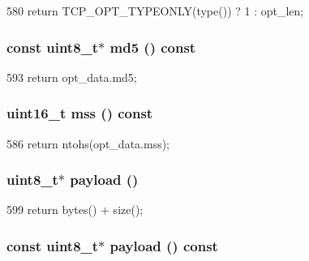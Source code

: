 \begin{DoxyCode}
580 { return TCP_OPT_TYPEONLY(type()) ? 1 : opt_len; }
\end{DoxyCode}
\hypertarget{structNet_1_1TcpOpt_ae647e910f0d658910b0dd25bb686ac46}{
\subsubsection[{md5}]{\setlength{\rightskip}{0pt plus 5cm}const uint8\_\-t$\ast$ md5 () const}}
\label{structNet_1_1TcpOpt_ae647e910f0d658910b0dd25bb686ac46}



\begin{DoxyCode}
593 { return opt_data.md5; }
\end{DoxyCode}
\hypertarget{structNet_1_1TcpOpt_a491854d4ab28d4ea5f41179a126d14d3}{
\subsubsection[{mss}]{\setlength{\rightskip}{0pt plus 5cm}uint16\_\-t mss () const}}
\label{structNet_1_1TcpOpt_a491854d4ab28d4ea5f41179a126d14d3}



\begin{DoxyCode}
586 { return ntohs(opt_data.mss); }
\end{DoxyCode}
\hypertarget{structNet_1_1TcpOpt_a79ce21e3572e587b71de7af1ac640b6f}{
\subsubsection[{payload}]{\setlength{\rightskip}{0pt plus 5cm}uint8\_\-t$\ast$ payload ()}}
\label{structNet_1_1TcpOpt_a79ce21e3572e587b71de7af1ac640b6f}



\begin{DoxyCode}
599 { return bytes() + size(); }
\end{DoxyCode}
\hypertarget{structNet_1_1TcpOpt_a5f0d069ddb9d067af9e94963bd1fc7a2}{
\subsubsection[{payload}]{\setlength{\rightskip}{0pt plus 5cm}const uint8\_\-t$\ast$ payload () const}}
\label{structNet_1_1TcpOpt_a5f0d069ddb9d067af9e94963bd1fc7a2}



